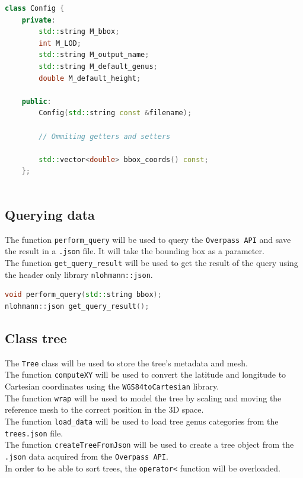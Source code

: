\documentclass[12pt]{article}
\begin{document}
\begin{lstlisting}[language=C++]
class Config {
    private:
        std::string M_bbox;
        int M_LOD;
        std::string M_output_name;
        std::string M_default_genus;
        double M_default_height;
    
    public:
        Config(std::string const &filename);

        // Ommiting getters and setters

        std::vector<double> bbox_coords() const;
    };
    
\end{lstlisting}

\subsection{Querying data}

The function \texttt{perform\_query} will be used to query the \texttt{Overpass API}
and save the result in a \texttt{.json} file. It will take the bounding box as a
parameter. \\
The function \texttt{get\_query\_result} will be used to get the result of the query
 using the header only library \texttt{nlohmann::json}.

\begin{lstlisting}[language=C++]
void perform_query(std::string bbox);
nlohmann::json get_query_result();
\end{lstlisting}

\subsection{Class tree}

The \texttt{Tree} class will be used to store the tree's metadata and mesh. \\
The function \texttt{computeXY} will be used to convert the latitude and longitude
to Cartesian coordinates using the \texttt{WGS84toCartesian} library. \\
The function \texttt{wrap} will be used to model the tree by scaling and moving
the reference mesh to the correct position in the 3D space. \\
The function \texttt{load\_data} will be used to load tree genus categories from
the \texttt{trees.json} file. \\
The function \texttt{createTreeFromJson} will be used to create a tree object from
the \texttt{.json} data acquired from the \texttt{Overpass API}. \\
In order to be able to sort trees, the \texttt{operator<} function will be overloaded.
\end{document}
